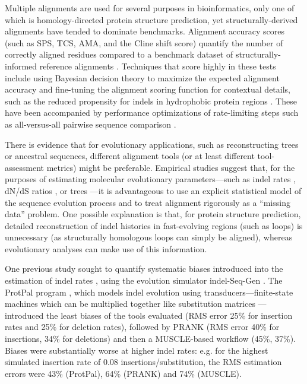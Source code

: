 \documentclass{bioinfo}
\begin{document}
Multiple alignments are used for several purposes in bioinformatics,
only one of which is homology-directed protein structure prediction,
yet structurally-derived alignments have tended to dominate benchmarks.
Alignment accuracy scores (such as SPS, TCS, AMA, and the Cline shift score) quantify the number of correctly aligned residues
compared to a benchmark dataset of structurally-informed reference alignments \citep{ThompsonEtAl2005}.
Techniques that score highly in these tests include using Bayesian decision theory to maximize the expected
alignment accuracy \citep{NotredameEtAl2000,DoEtAl2005,SchwartzPachter2007,BradleyEtAl2009}
and fine-tuning the alignment scoring function for contextual details, such as the reduced propensity for indels in
hydrophobic protein regions \citep{KatohEtAl2005,Edgar2004b,LarkinEtAl2007}.
These have been accompanied by performance optimizations of 
rate-limiting steps such as all-versus-all pairwise sequence comparison \citep{BradleyEtAl2009,Edgar2004b}.

There is evidence that for evolutionary applications, such as reconstructing trees or ancestral sequences,
different alignment tools (or at least different tool-assessment metrics) might be preferable.
Empirical studies suggest that, for the purposes of estimating
molecular evolutionary parameters---such as indel rates \citep{Westesson2012-zg},
dN/dS ratios \citep{Redelings2014},
or trees \citep{LoytynojaGoldman2008}---it is advantageous to use an explicit statistical model of the sequence evolution process
and to treat alignment rigorously as a ``missing data'' problem.
One possible explanation is that, for protein structure prediction,
detailed reconstruction of indel histories in fast-evolving regions (such as loops) is unnecessary
(as structurally homologous loops can simply be aligned),
whereas evolutionary analyses can make use of this information.

One previous study sought to quantify systematic biases introduced into the
estimation of indel rates \citep{Westesson2012-zg},
using the evolution simulator indel-Seq-Gen \citep{StropeEtAl2009}.
The ProtPal program \citep{Westesson2012-zg}, which models indel evolution using 
transducers---finite-state machines which can be multiplied together like substitution matrices \citep{BouchardCote2013}---introduced
the least biases of the tools evaluated (RMS error 25\% for insertion rates and 25\% for deletion rates),
followed by PRANK (RMS error 40\% for insertions, 34\% for deletions) and then a MUSCLE-based workflow (45\%, 37\%).
Biases were substantially worse at higher indel rates: e.g. for the highest simulated insertion rate of 0.08 insertions/substitution,
the RMS estimation errors were 43\% (ProtPal), 64\% (PRANK) and 74\% (MUSCLE).
\end{document}
